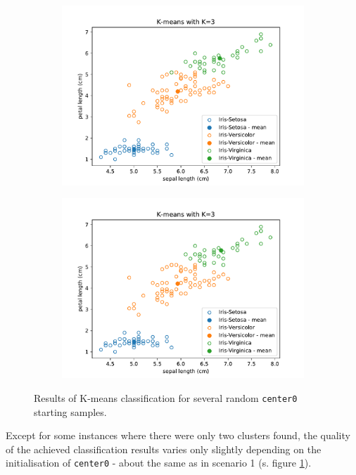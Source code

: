 \documentclass{article}
\begin{document}
\begin{figure}[!ht]
{\begin{subfigure}{0.6\textwidth}
	\includegraphics[width=\textwidth]{./Figures/2_2_Kmeans_randinit2}
	\end{subfigure}
	\begin{subfigure}{0.6\textwidth}
	\includegraphics[width=\textwidth]{./Figures/2_2_Kmeans_randinit3}
	\end{subfigure}
	}	
	\caption{Results of K-means classification for several random \texttt{center0} starting samples.}
	\label{2_2_Kmeans_randinit}
\end{figure}

Except for some instances where there were only two clusters found, the quality of the achieved classification results varies only slightly depending on the initialisation of \texttt{center0} - about the same as in scenario 1 (s. figure \ref{2_2_Kmeans_randinit}).
\end{document}
